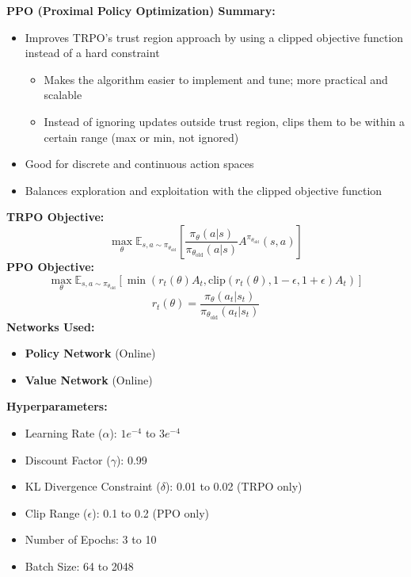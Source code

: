 \documentclass[a4paper,10pt]{article}
\begin{document}
\begin{multicols}{2}
\noindent \textbf{PPO (Proximal Policy Optimization) Summary:}
\begin{itemize}
    \item Improves TRPO's trust region approach by using a clipped objective function instead of a hard constraint
    \begin{itemize}
        \item Makes the algorithm easier to implement and tune; more practical and scalable
        \item Instead of ignoring updates outside trust region, clips them to be within a certain range (max or min, not ignored)
    \end{itemize}
    \item Good for discrete and continuous action spaces   
    \item Balances exploration and exploitation with the clipped objective function 
\end{itemize}

\noindent \textbf{TRPO Objective:}
\[
\max_\theta \mathbb{E}_{s, a \sim \pi_{\theta_{\text{old}}}} \left[ \frac{\pi_\theta(a|s)}{\pi_{\theta_{\text{old}}}(a|s)} A^{\pi_{\theta_{\text{old}}}}(s, a) \right]
\]
\textbf{PPO Objective:}
\[
\max_\theta \mathbb{E}_{s, a \sim \pi_{\theta_{\text{old}}}} \left[ \min\left( r_t(\theta) A_t, \text{clip}(r_t(\theta), 1-\epsilon, 1+\epsilon) A_t \right) \right]
\]
\[
r_t(\theta) = \frac{\pi_\theta(a_t | s_t)}{\pi_{\theta_{\text{old}}}(a_t | s_t)}
\]
\textbf{Networks Used:}
\begin{itemize}
    \item \textbf{Policy Network} (Online)
    \item \textbf{Value Network} (Online)
\end{itemize}
\textbf{Hyperparameters:}
\begin{itemize}
    \item Learning Rate (\(\alpha\)): \(1e^{-4}\) to \(3e^{-4}\)
    \item Discount Factor (\(\gamma\)): 0.99
    \item KL Divergence Constraint (\(\delta\)): 0.01 to 0.02 (TRPO only)
    \item Clip Range (\(\epsilon\)): 0.1 to 0.2 (PPO only)
    \item Number of Epochs: 3 to 10
    \item Batch Size: 64 to 2048
\end{itemize}


\end{multicols}
\end{document}
